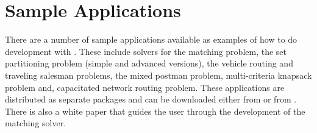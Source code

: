 \section{Sample Applications}

There are a number of sample applications available as examples of how to do
development with \BB. These include solvers for the matching problem, the set
partitioning problem (simple and advanced versions), the vehicle routing and
traveling salesman problems, the mixed postman problem, multi-criteria 
knapsack problem and, capacitated
network routing problem. These applications are distributed as separate
packages and can be downloaded either from
\texttt{} or from 
\texttt{}. There is also a white paper that guides the
user through the development of the matching solver.
